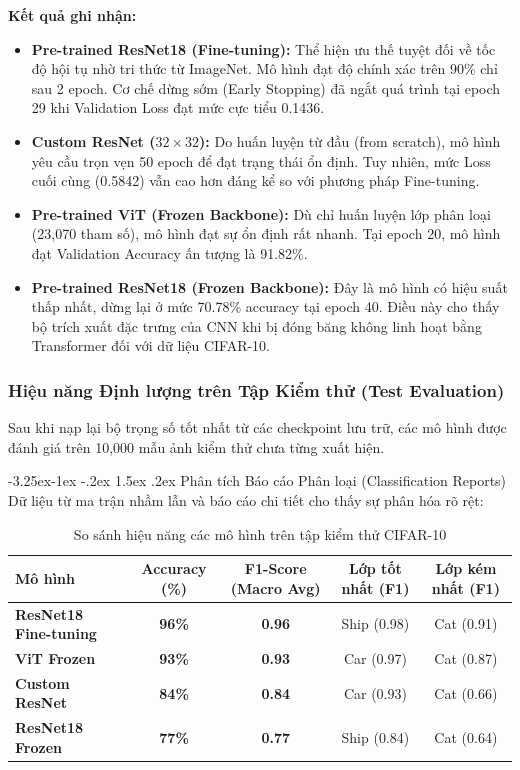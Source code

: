 \documentclass[a4paper]{article}
\makeatletter
\theoremstyle{definition}
\newcounter {subsubsubsection}[subsubsection]
\newcommand\subsubsubsection{\@startsection{subsubsubsection}{4}{\z@}%
                                     {-3.25ex\@plus -1ex \@minus -.2ex}%
                                     {1.5ex \@plus .2ex}%
                                     {\normalfont\normalsize\bfseries}}
\makeatother
\begin{document}
\textbf{Kết quả ghi nhận:}
\begin{itemize}
	\item \textbf{Pre-trained ResNet18 (Fine-tuning):} Thể hiện ưu thế tuyệt đối về tốc độ hội tụ nhờ tri thức từ ImageNet. Mô hình đạt độ chính xác trên 90\% chỉ sau 2 epoch. Cơ chế dừng sớm (Early Stopping) đã ngắt quá trình tại epoch 29 khi Validation Loss đạt mức cực tiểu 0.1436.
	\item \textbf{Custom ResNet ($32 \times 32$):} Do huấn luyện từ đầu (from scratch), mô hình yêu cầu trọn vẹn 50 epoch để đạt trạng thái ổn định. Tuy nhiên, mức Loss cuối cùng (0.5842) vẫn cao hơn đáng kể so với phương pháp Fine-tuning.
	\item \textbf{Pre-trained ViT (Frozen Backbone):} Dù chỉ huấn luyện lớp phân loại (23,070 tham số), mô hình đạt sự ổn định rất nhanh. Tại epoch 20, mô hình đạt Validation Accuracy ấn tượng là 91.82\%.
	\item \textbf{Pre-trained ResNet18 (Frozen Backbone):} Đây là mô hình có hiệu suất thấp nhất, dừng lại ở mức 70.78\% accuracy tại epoch 40. Điều này cho thấy bộ trích xuất đặc trưng của CNN khi bị đóng băng không linh hoạt bằng Transformer đối với dữ liệu CIFAR-10.
\end{itemize}

\subsubsection{Hiệu năng Định lượng trên Tập Kiểm thử (Test Evaluation)}

Sau khi nạp lại bộ trọng số tốt nhất từ các checkpoint lưu trữ, các mô hình được đánh giá trên 10,000 mẫu ảnh kiểm thử chưa từng xuất hiện.

\subsubsubsection{Phân tích Báo cáo Phân loại (Classification Reports)}
Dữ liệu từ ma trận nhầm lẫn và báo cáo chi tiết cho thấy sự phân hóa rõ rệt:

\begin{table}[H]
	\centering
	\caption{So sánh hiệu năng các mô hình trên tập kiểm thử CIFAR-10}
	\begin{tabular}{|l|c|c|c|c|}
		\hline
		\textbf{Mô hình}              & \textbf{Accuracy (\%)} & \textbf{F1-Score (Macro Avg)} & \textbf{Lớp tốt nhất (F1)} & \textbf{Lớp kém nhất (F1)} \\
		\hline
		\textbf{ResNet18 Fine-tuning} & \textbf{96\%}          & \textbf{0.96}                 & Ship (0.98)                & Cat (0.91)                 \\
		\hline
		\textbf{ViT Frozen}           & \textbf{93\%}          & \textbf{0.93}                 & Car (0.97)                 & Cat (0.87)                 \\
		\hline
		\textbf{Custom ResNet}        & \textbf{84\%}          & \textbf{0.84}                 & Car (0.93)                 & Cat (0.66)                 \\
		\hline
		\textbf{ResNet18 Frozen}      & \textbf{77\%}          & \textbf{0.77}                 & Ship (0.84)                & Cat (0.64)                 \\
		\hline
	\end{tabular}
	\label{tab:cifar10-results}
\end{table}
\end{document}
